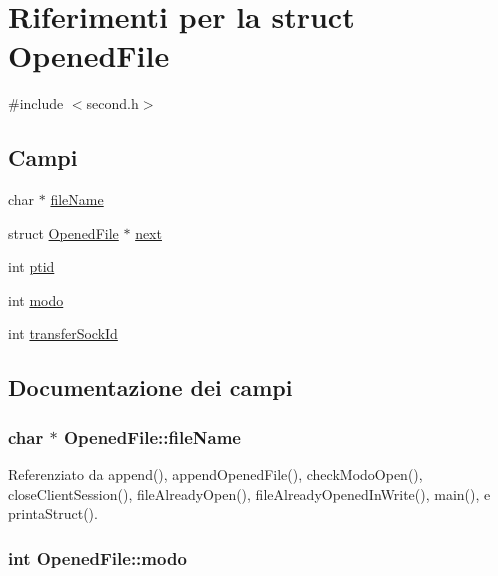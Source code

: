 \hypertarget{structOpenedFile}{}\section{Riferimenti per la struct Opened\+File}
\label{structOpenedFile}


{\ttfamily \#include $<$second.\+h$>$}

\subsection*{Campi}
\begin{DoxyCompactItemize}
\item 
char $\ast$ \hyperlink{structOpenedFile_abcff0610dfa8b1e3836b3f5bac40c8f5}{file\+Name}
\item 
struct \hyperlink{structOpenedFile}{Opened\+File} $\ast$ \hyperlink{structOpenedFile_a9b8c8b995cdda6da249a6ce9a9df98b2}{next}
\item 
int \hyperlink{structOpenedFile_aba1e9ae457adfa6a9cc6a22ca4ee290d}{ptid}
\item 
int \hyperlink{structOpenedFile_a6d9f22ff6ba81506ba9c4a60f27c4f32}{modo}
\item 
int \hyperlink{structOpenedFile_a122a7d3d722dc1f7c63857af2024f098}{transfer\+Sock\+Id}
\end{DoxyCompactItemize}


\subsection{Documentazione dei campi}
\hypertarget{structOpenedFile_abcff0610dfa8b1e3836b3f5bac40c8f5}{}
\subsubsection[{file\+Name}]{\setlength{\rightskip}{0pt plus 5cm}char $\ast$ Opened\+File\+::file\+Name}\label{structOpenedFile_abcff0610dfa8b1e3836b3f5bac40c8f5}


Referenziato da append(), append\+Opened\+File(), check\+Modo\+Open(), close\+Client\+Session(), file\+Already\+Open(), file\+Already\+Opened\+In\+Write(), main(), e printa\+Struct().

\hypertarget{structOpenedFile_a6d9f22ff6ba81506ba9c4a60f27c4f32}{}
\subsubsection[{modo}]{\setlength{\rightskip}{0pt plus 5cm}int Opened\+File\+::modo}\label{structOpenedFile_a6d9f22ff6ba81506ba9c4a60f27c4f32}


